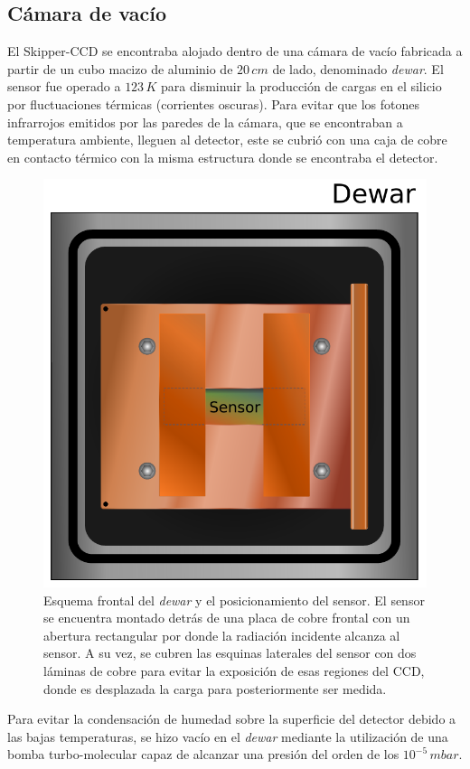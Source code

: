 \subsection{Cámara de vacío}
\noindent El Skipper-CCD se encontraba alojado dentro de una cámara de vacío fabricada a partir de un cubo macizo de aluminio de $20\,\si{cm}$ de lado, denominado \textit{dewar}. El sensor fue operado a $123\,\si{K}$ para disminuir la producción de cargas en el silicio por fluctuaciones térmicas (corrientes oscuras). Para evitar que los fotones infrarrojos emitidos por las paredes de la cámara, que se encontraban a temperatura ambiente, lleguen al detector, este se cubrió con una caja de cobre en contacto térmico con la misma estructura donde se encontraba el detector. 
\begin{figure}[h]
    \centering
    \includegraphics[scale=0.5]{Figs/Frontal_Dewar_Sensor.pdf}
    \caption{Esquema frontal del \textit{dewar} y el posicionamiento del sensor. El sensor se encuentra montado detrás de una placa de cobre frontal con un abertura rectangular por donde la radiación incidente alcanza al sensor. A su vez, se cubren las esquinas laterales del sensor con dos láminas de cobre para evitar la exposición de esas regiones del CCD, donde es desplazada la carga para posteriormente ser medida.}
    \label{fig:FrontalDewarYSensor}
\end{figure}
Para evitar la condensación de humedad sobre la superficie del detector debido a las bajas temperaturas, se hizo vacío en el \textit{dewar} mediante la utilización de una bomba turbo-molecular capaz de alcanzar una presión del orden de los $10^{-5}\,\si{mbar}$.

